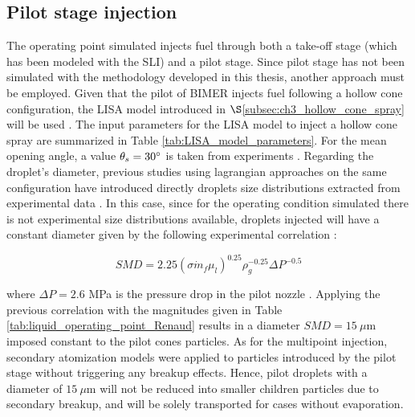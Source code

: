 %




\subsection{Pilot stage injection}

The operating point simulated injects fuel through both a take-off stage (which has been modeled with the SLI) and a pilot stage. Since pilot stage has not been simulated with the methodology developed in this thesis, another approach must be employed. Given that the pilot of BIMER injects fuel following a hollow cone configuration, the LISA model introduced in $\S$\ref{subsec:ch3_hollow_cone_spray} will be used .   The input parameters for the LISA model to inject a hollow cone spray are summarized in Table \ref{tab:LISA_model_parameters}. For the mean opening angle, a value $\theta_s = 30 \degree$ is taken from experiments . Regarding the droplet's diameter, previous studies using lagrangian approaches on the same configuration have introduced directly droplets size distributions extracted from experimental data . In this case, since for the operating condition simulated there is not experimental size distributions available, droplets injected will have a constant diameter given by the following experimental correlation :

\begin{equation}
SMD = 2.25 \left( \sigma \dot{m}_f \mu_l \right)^{0.25} \rho_g^{-0.25}  \Delta P^{-0.5}
\end{equation}

where $\Delta P = 2.6$ MPa is the pressure drop in the pilot nozzle . Applying the previous correlation with the magnitudes given in Table \ref{tab:liquid_operating_point_Renaud} results in a diameter $SMD = 15~\mu$m imposed constant to the pilot cones particles. As for the multipoint injection, secondary atomization models were applied to  particles introduced by the pilot stage without triggering any breakup effects. Hence, pilot droplets with a diameter of $15~\mu$m will not be reduced into smaller children particles due to secondary breakup, and will be solely transported for cases without evaporation. 

